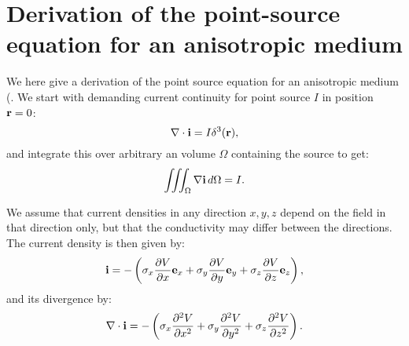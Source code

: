 \chapter{Derivation of the point-source equation for an anisotropic medium}
\label{app:Aniso}
We here give a derivation of the point source equation for an anisotropic medium
(. We start with demanding current continuity 
for point source $I$ in position ${\bf r} = 0$: 
\begin{equation}
\nabla\cdot{\mathbf{i}} = I \delta^3({\bf r}), 
\label{eq:AppAniso:1}
\end{equation}
and integrate this over arbitrary an volume $\Omega$ containing the source to get: 
\begin{equation}
\iiint_{\Omega} \nabla {\bf i} \,d\Omega =  I.
\label{eq:AppAniso:marit}
\end{equation}

We assume that current densities in any direction $x,y,z$ depend on the field in that direction only, 
but that the conductivity may differ between the directions. The current density is then given by: 
\begin{equation}
{\bf i} = - \left(\sigma_x \frac{\partial V}{\partial x} {\bf e}_x +
 \sigma_y \frac{\partial V}{\partial y} {\bf e}_y +
  \sigma_z \frac{\partial V}{\partial z} {\bf e}_z \right), 
\label{eq:AppAniso:i}
\end{equation}
and its divergence by: 
\begin{equation}
\nabla \cdot {\bf i} = -\left(\sigma_x \frac{\partial^2 V}{\partial x^2} +
 \sigma_y \frac{\partial^2 V}{\partial y^2}+
  \sigma_z \frac{\partial^2 V}{\partial z^2} \right).
\label{eq:AppAniso:nablai}
\end{equation}

